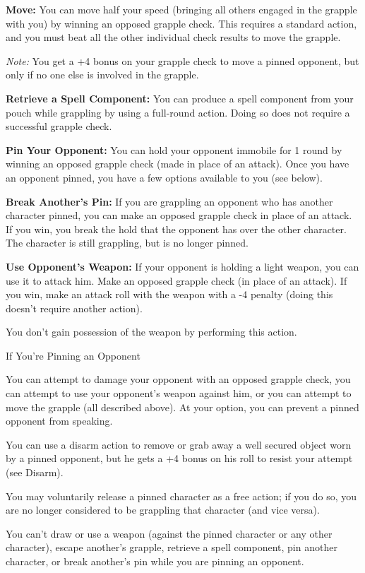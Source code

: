 \documentclass{article}
\begin{document}
\textbf{Move:} You can move half your speed (bringing all others engaged in the 
grapple with you) by winning an opposed grapple check. This requires a standard 
action, and you must beat all the other individual check results to move the grapple.

\textit{Note: }You get a +4 bonus on your grapple check to move a pinned opponent, 
but only if no one else is involved in the grapple.

\textbf{Retrieve a Spell Component: }You can produce a spell component from your 
pouch while grappling by using a full-round action. Doing so does not require a 
successful grapple check.

\textbf{Pin Your Opponent:} You can hold your opponent immobile for 1 round by 
winning an opposed grapple check (made in place of an attack). Once you have an 
opponent pinned, you have a few options available to you (see below).

\textbf{Break Another's Pin: }If you are grappling an opponent who has another 
character pinned, you can make an opposed grapple check in place of an attack. 
If you win, you break the hold that the opponent has over the other character. 
The character is still grappling, but is no longer pinned.

\textbf{Use Opponent's Weapon: }If your opponent is holding a light weapon, you 
can use it to attack him. Make an opposed grapple check (in place of an attack). 
If you win, make an attack roll with the weapon with a -4 penalty (doing this doesn't 
require another action).

You don't gain possession of the weapon by performing this action.

\vspace{12pt}
If You're Pinning an Opponent

You can attempt to damage your opponent with an opposed grapple check, you can 
attempt to use your opponent's weapon against him, or you can attempt to move the 
grapple (all described above). At your option, you can prevent a pinned opponent 
from speaking.

You can use a disarm action to remove or grab away a well secured object worn by 
a pinned opponent, but he gets a +4 bonus on his roll to resist your attempt (see 
Disarm).

You may voluntarily release a pinned character as a free action; if you do so, 
you are no longer considered to be grappling that character (and vice versa).

You can't draw or use a weapon (against the pinned character or any other character), 
escape another's grapple, retrieve a spell component, pin another character, or 
break another's pin while you are pinning an opponent.
\end{document}
